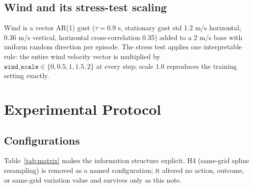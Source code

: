 \documentclass[conference]{IEEEtran}
\begin{document}
\subsection{Wind and its stress-test scaling}
Wind is a vector AR(1) gust ($\tau=0.9$ s, stationary gust std 1.2 m/s horizontal, 0.36 m/s vertical, horizontal
cross-correlation 0.35) added to a 2 m/s base with uniform random direction per episode. The stress test applies
one interpretable rule: the entire wind velocity vector is multiplied by $\texttt{wind\_scale}\in\{0,0.5,1,1.5,2\}$
at every step; scale 1.0 reproduces the training setting exactly.

\section{Experimental Protocol}
\subsection{Configurations}
Table~\ref{tab:matrix} makes the information structure explicit. H4 (same-grid spline resampling) is removed as
a named configuration; it altered no action, outcome, or same-grid variation value and survives only as this note.
\begin{table}[t]
\centering
\caption{Controller matrix. ``Geo to policy'' is the learned observation; ``Geo to APF'' is the analytical channel.}
\label{tab:matrix}
\end{table}
\end{document}
